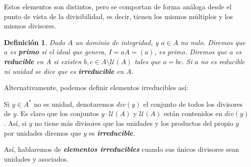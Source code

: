 \documentclass[12pt]{article}
\newtheorem{definition}[theorem]{Definición}
\begin{document}
Estos elementos son distintos, pero se comportan de forma análoga desde el punto de vista de la divisibilidad, es decir, tienen los mismos múltiplos y los mismos divisores.

\begin{definition} Dado $A$ un dominio de integridad, y $a \in A$ no nulo. Diremos que $a$ es \textbf{primo} si el ideal que genera, $I=aA = (a)$, es primo. Diremos que $a$ es \textbf{reducible} en $A$ si existen $b,c \in A \setminus \mathcal{U}(A)$ tales que $a =bc$. Si $a$ no es reducible ni unidad se dice que es \textbf{irreducible} en $A$.
\end{definition}

Alternativamente, podemos definir elementos irreducibles así: 

Si $y \in A^{\ast}$ no es unidad, denotaremos $div(y)$ el conjunto de todos los divisores de $y$. Es claro que los conjuntos $y \cdot \mathcal{U}(A)$ y $\mathcal{U}(A)$ están contenidos en $div(y)$. Así, si $y$ no tiene más divisores que las unidades y los productos del propio $y$ por unidades diremos que $y$ es \textbf{\textit{irreducible}}.

Así, hablaremos de \textbf{\textit{elementos irreducibles}} cuando sus únicos divisores sean unidades y asociados.
\end{document}
